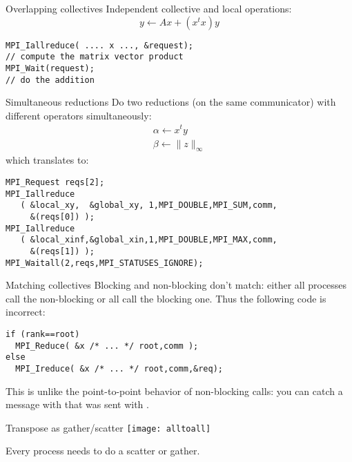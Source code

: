 \begin{numberedframe}{Overlapping collectives}
  \label{sl:coll-nonblock-overlap}
  Independent collective and local operations:
\[ y \leftarrow Ax + (x^tx)y \]
\begin{lstlisting}
MPI_Iallreduce( .... x ..., &request);
// compute the matrix vector product
MPI_Wait(request);
// do the addition
\end{lstlisting}
\end{numberedframe}

\begin{numberedframe}{Simultaneous reductions}
  \label{sl:coll-nonblock-simult}
  Do two reductions (on the same communicator) with different
  operators simultaneously:
  \[ 
  \begin{array}{l}
    \alpha\leftarrow x^ty\\
    \beta\leftarrow \|z\|_\infty
  \end{array}
  \]
which translates to:
\begin{lstlisting}
MPI_Request reqs[2];
MPI_Iallreduce
   ( &local_xy,  &global_xy, 1,MPI_DOUBLE,MPI_SUM,comm,
     &(reqs[0]) );
MPI_Iallreduce
   ( &local_xinf,&global_xin,1,MPI_DOUBLE,MPI_MAX,comm,
     &(reqs[1]) );
MPI_Waitall(2,reqs,MPI_STATUSES_IGNORE);
\end{lstlisting}
\end{numberedframe}

\begin{exerciseframe}[procgridnonblock]
  \label{sl:coll-nonblock-exgrid}
  \hyperlink{ex:rowcolcomm}{}

  
\end{exerciseframe}

\begin{numberedframe}{Matching collectives}
  \label{sl:coll-nonblock-match}
  Blocking and non-blocking don't match: either all processes
  call the non-blocking or all call the blocking one.
  Thus the following code is incorrect:
\begin{lstlisting}
if (rank==root)
  MPI_Reduce( &x /* ... */ root,comm );
else
  MPI_Ireduce( &x /* ... */ root,comm,&req);
\end{lstlisting}
  This is unlike the point-to-point behavior of non-blocking calls:
  you can catch a message with 
  that was sent with .
\end{numberedframe}

\begin{numberedframe}{Transpose as gather/scatter}
  \texttt{[image: alltoall]}

  Every process needs to do a scatter or gather.
\end{numberedframe}

